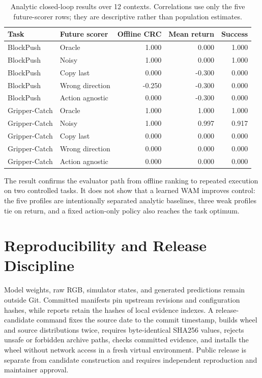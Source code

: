 \documentclass[10pt]{article}
\begin{document}
\begin{table}[t]
\centering
\small
\caption{Analytic closed-loop results over 12 contexts. Correlations use only the five
future-scorer rows; they are descriptive rather than population estimates.}
\label{tab:closedloop}
\begin{tabular}{llrrr}
\toprule
Task & Future scorer & Offline CRC & Mean return & Success \\
\midrule
BlockPush & Oracle & 1.000 & 0.000 & 1.000 \\
BlockPush & Noisy & 1.000 & 0.000 & 1.000 \\
BlockPush & Copy last & 0.000 & -0.300 & 0.000 \\
BlockPush & Wrong direction & -0.250 & -0.300 & 0.000 \\
BlockPush & Action agnostic & 0.000 & -0.300 & 0.000 \\
Gripper-Catch & Oracle & 1.000 & 1.000 & 1.000 \\
Gripper-Catch & Noisy & 1.000 & 0.997 & 0.917 \\
Gripper-Catch & Copy last & 0.000 & 0.000 & 0.000 \\
Gripper-Catch & Wrong direction & 0.000 & 0.000 & 0.000 \\
Gripper-Catch & Action agnostic & 0.000 & 0.000 & 0.000 \\
\bottomrule
\end{tabular}
\end{table}

The result confirms the evaluator path from offline ranking to repeated execution on two
controlled tasks. It does not show that a learned WAM improves control: the five profiles
are intentionally separated analytic baselines, three weak profiles tie on return, and a
fixed action-only policy also reaches the task optimum.

\section{Reproducibility and Release Discipline}

Model weights, raw RGB, simulator states, and generated predictions remain outside Git.
Committed manifests pin upstream revisions and configuration hashes, while reports retain
the hashes of local evidence indexes. A release-candidate command fixes the source date to
the commit timestamp, builds wheel and source distributions twice, requires byte-identical
SHA256 values, rejects unsafe or forbidden archive paths, checks committed evidence, and
installs the wheel without network access in a fresh virtual environment. Public release
is separate from candidate construction and requires independent reproduction and
maintainer approval.
\end{document}
